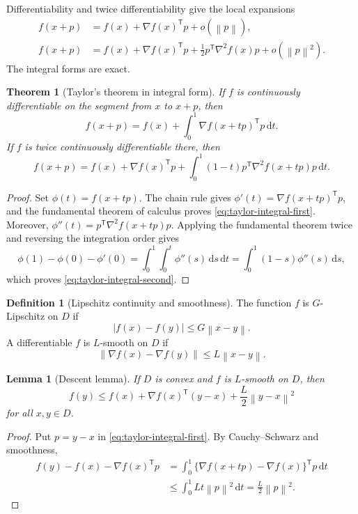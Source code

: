 \documentclass[12pt,oneside]{book}
\numberwithin{equation}{section}
\theoremstyle{definition}
\newtheorem{definition}{Definition}[section]
\theoremstyle{plain}
\newtheorem{theorem}{Theorem}[section]
\newtheorem{lemma}{Lemma}[section]
\theoremstyle{remark}
\newcommand{\norm}[1]{\left\lVert #1 \right\rVert}
\newcommand{\dd}{\,\mathrm{d}}
\newcommand{\grad}{\nabla}
\newcommand{\Hess}{\nabla^2}
\begin{document}
Differentiability and twice differentiability give the local expansions
\begin{align*}
 f(x+p)&=f(x)+\grad f(x)^\mathsf Tp+o(\norm p),\\
 f(x+p)&=f(x)+\grad f(x)^\mathsf Tp
 +\frac12p^\mathsf T\Hess f(x)p+o(\norm p^2).
\end{align*}
The integral forms are exact.

\begin{theorem}[Taylor's theorem in integral form]
If $f$ is continuously differentiable on the segment from $x$ to $x+p$, then
\begin{equation}
 f(x+p)=f(x)+\int_0^1\grad f(x+tp)^\mathsf Tp\dd t.
 \label{eq:taylor-integral-first}
\end{equation}
If $f$ is twice continuously differentiable there, then
\begin{equation}
 f(x+p)=f(x)+\grad f(x)^\mathsf Tp
 +\int_0^1(1-t)p^\mathsf T\Hess f(x+tp)p\dd t.
 \label{eq:taylor-integral-second}
\end{equation}
\end{theorem}

\begin{proof}
Set $\phi(t)=f(x+tp)$. The chain rule gives
$\phi'(t)=\grad f(x+tp)^\mathsf Tp$, and the fundamental theorem of calculus
proves \cref{eq:taylor-integral-first}. Moreover,
$\phi''(t)=p^\mathsf T\Hess f(x+tp)p$. Applying the fundamental theorem twice
and reversing the integration order gives
\[
 \phi(1)-\phi(0)-\phi'(0)
 =\int_0^1\int_0^t\phi''(s)\dd s\dd t
 =\int_0^1(1-s)\phi''(s)\dd s,
\]
which proves \cref{eq:taylor-integral-second}.
\end{proof}

\begin{definition}[Lipschitz continuity and smoothness]
The function $f$ is $G$-Lipschitz on $D$ if
\[
 |f(x)-f(y)|\leq G\norm{x-y}.
\]
A differentiable $f$ is $L$-smooth on $D$ if
\[
 \norm{\grad f(x)-\grad f(y)}\leq L\norm{x-y}.
\]
\end{definition}

\begin{lemma}[Descent lemma]
If $D$ is convex and $f$ is $L$-smooth on $D$, then
\begin{equation}
 f(y)\leq f(x)+\grad f(x)^\mathsf T(y-x)
 +\frac L2\norm{y-x}^2
 \label{eq:descent-lemma}
\end{equation}
for all $x,y\in D$.
\end{lemma}

\begin{proof}
Put $p=y-x$ in \cref{eq:taylor-integral-first}. By Cauchy--Schwarz and
smoothness,
\begin{align*}
 f(y)-f(x)-\grad f(x)^\mathsf Tp
 &=\int_0^1\{\grad f(x+tp)-\grad f(x)\}^\mathsf Tp\dd t\\
 &\leq\int_0^1Lt\norm p^2\dd t
 =\frac L2\norm p^2.
\end{align*}
\end{proof}
\end{document}
